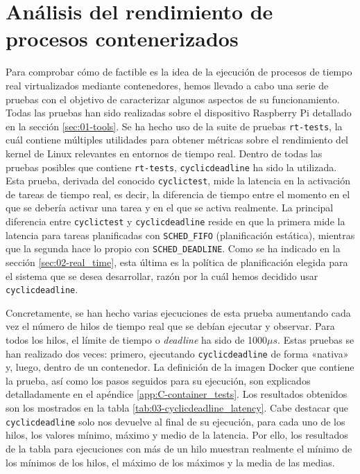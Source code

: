 \chapter{Análisis del rendimiento de procesos contenerizados}
\label{ch:03-performance_analysis}

Para comprobar cómo de factible es la idea de la ejecución de procesos de tiempo
real virtualizados mediante contenedores, hemos llevado a cabo una serie de
pruebas con el objetivo de caracterizar algunos aspectos de su funcionamiento.
Todas las pruebas han sido realizadas sobre el dispositivo Raspberry Pi
detallado en la sección \ref{sec:01-tools}. Se ha hecho uso de la suite de
pruebas \texttt{rt-tests}, la cuál contiene múltiples utilidades para obtener
métricas sobre el rendimiento del kernel de Linux relevantes en entornos de
tiempo real. Dentro de todas las pruebas posibles que contiene
\texttt{rt-tests}, \texttt{cyclicdeadline} ha sido la utilizada. Esta prueba,
derivada del conocido \texttt{cyclictest}, mide la latencia en la activación de
tareas de tiempo real, es decir, la diferencia de tiempo entre el momento en el
que se debería activar una tarea y en el que se activa realmente. La principal
diferencia entre \texttt{cyclictest} y \texttt{cyclicdeadline} reside en que la
primera mide la latencia para tareas planificadas con \texttt{SCHED\_FIFO}
(planificación estática), mientras que la segunda hace lo propio con
\texttt{SCHED\_DEADLINE}. Como se ha indicado en la sección
\ref{sec:02-real_time}, esta última es la política de planificación elegida para
el sistema que se desea desarrollar, razón por la cuál hemos decidido usar
\texttt{cyclicdeadline}.

Concretamente, se han hecho varias ejecuciones de esta prueba aumentando cada
vez el número de hilos de tiempo real que se debían ejecutar y observar. Para
todos los hilos, el límite de tiempo o \textit{deadline} ha sido de 1000$\mu s$.
Estas pruebas se han realizado dos veces: primero, ejecutando
\texttt{cyclicdeadline} de forma «nativa» y, luego, dentro de un contenedor. La
definición de la imagen Docker que contiene la prueba, así como los pasos
seguidos para su ejecución, son explicados detalladamente en el apéndice
\ref{app:C-container_tests}. Los resultados obtenidos son los mostrados en la
tabla \ref{tab:03-cyclicdeadline_latency}. Cabe destacar que
\texttt{cyclicdeadline} solo nos devuelve al final de su ejecución, para cada
uno de los hilos, los valores mínimo, máximo y medio de la latencia. Por ello,
los resultados de la tabla para ejecuciones con más de un hilo muestran
realmente el mínimo de los mínimos de los hilos, el máximo de los máximos y la
media de las medias.

